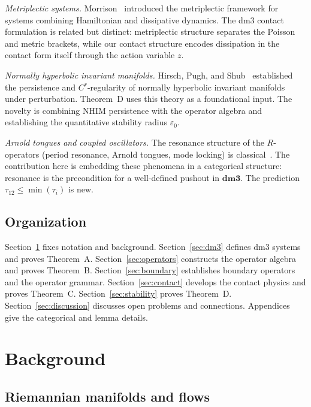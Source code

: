 \documentclass[12pt, oneside]{book}
\theoremstyle{plain}
\theoremstyle{definition}
\theoremstyle{remark}
\newcommand{\dmcat}{\mathbf{dm3}}
\begin{document}
\emph{Metriplectic systems.}
Morrison~\cite{Morrison1986} introduced the metriplectic framework for
systems combining Hamiltonian and dissipative dynamics. The dm3 contact
formulation is related but distinct: metriplectic structure separates the
Poisson and metric brackets, while our contact structure encodes dissipation
in the contact form itself through the action variable $z$.

\emph{Normally hyperbolic invariant manifolds.}
Hirsch, Pugh, and Shub~\cite{HPS} established the persistence and
$C^r$-regularity of normally hyperbolic invariant manifolds under
perturbation. Theorem~D uses this theory as a foundational input.
The novelty is combining NHIM persistence with the operator algebra
and establishing the quantitative stability radius $\varepsilon_0$.

\emph{Arnold tongues and coupled oscillators.}
The resonance structure of the $R$-operators (period resonance, Arnold
tongues, mode locking) is classical~\cite{Arnold,PRK}. The contribution
here is embedding these phenomena in a categorical structure: resonance is
the precondition for a well-defined pushout in $\dmcat$. The prediction
$\tau_{12}\le\min(\tau_i)$ is new.

\subsection{Organization}

Section~\ref{sec:background} fixes notation and background.
Section~\ref{sec:dm3} defines dm3 systems and proves Theorem~A.
Section~\ref{sec:operators} constructs the operator algebra and proves
Theorem~B.
Section~\ref{sec:boundary} establishes boundary operators and the
operator grammar.
Section~\ref{sec:contact} develops the contact physics and proves
Theorem~C.
Section~\ref{sec:stability} proves Theorem~D.
Section~\ref{sec:discussion} discusses open problems and connections.
Appendices give the categorical and lemma details.

\section{Background}\label{sec:background}

\subsection{Riemannian manifolds and flows}
\end{document}
